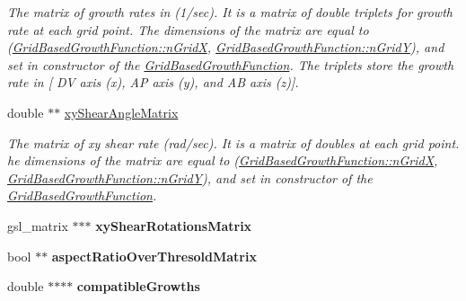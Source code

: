 \begin{DoxyCompactItemize}
\begin{DoxyCompactList}\small\item\em The matrix of growth rates in (1/sec). It is a matrix of double triplets for growth rate at each grid point. The dimensions of the matrix are equal to (\hyperlink{classGridBasedGrowthFunction_af872b9963f3a579dcd615c23bcb58a86}{Grid\+Based\+Growth\+Function\+::n\+Grid\+X}, \hyperlink{classGridBasedGrowthFunction_a625bc963a1f1e7d1f1a35dbd0ef51728}{Grid\+Based\+Growth\+Function\+::n\+Grid\+Y}), and set in constructor of the \hyperlink{classGridBasedGrowthFunction}{Grid\+Based\+Growth\+Function}. The triplets store the growth rate in \mbox{[} D\+V axis (x), A\+P axis (y), and A\+B axis (z)\mbox{]}. \end{DoxyCompactList}\item 
\hypertarget{classGridBasedGrowthFunction_aa01cee8282299e18f27b47645da17438}{}double $\ast$$\ast$ \hyperlink{classGridBasedGrowthFunction_aa01cee8282299e18f27b47645da17438}{xy\+Shear\+Angle\+Matrix}\label{classGridBasedGrowthFunction_aa01cee8282299e18f27b47645da17438}

\begin{DoxyCompactList}\small\item\em The matrix of xy shear rate (rad/sec). It is a matrix of doubles at each grid point. he dimensions of the matrix are equal to (\hyperlink{classGridBasedGrowthFunction_af872b9963f3a579dcd615c23bcb58a86}{Grid\+Based\+Growth\+Function\+::n\+Grid\+X}, \hyperlink{classGridBasedGrowthFunction_a625bc963a1f1e7d1f1a35dbd0ef51728}{Grid\+Based\+Growth\+Function\+::n\+Grid\+Y}), and set in constructor of the \hyperlink{classGridBasedGrowthFunction}{Grid\+Based\+Growth\+Function}. \end{DoxyCompactList}\item 
\hypertarget{classGridBasedGrowthFunction_a62e3267b367261ff2f37cee9a7c2b02b}{}gsl\+\_\+matrix $\ast$$\ast$$\ast$ {\bfseries xy\+Shear\+Rotations\+Matrix}\label{classGridBasedGrowthFunction_a62e3267b367261ff2f37cee9a7c2b02b}

\item 
\hypertarget{classGridBasedGrowthFunction_a56ff4380487e4d24881431f0e6ea6f2e}{}bool $\ast$$\ast$ {\bfseries aspect\+Ratio\+Over\+Thresold\+Matrix}\label{classGridBasedGrowthFunction_a56ff4380487e4d24881431f0e6ea6f2e}

\item 
\hypertarget{classGridBasedGrowthFunction_a59b0e127387157f89f099ae3beeaa671}{}double $\ast$$\ast$$\ast$$\ast$ {\bfseries compatible\+Growths}\label{classGridBasedGrowthFunction_a59b0e127387157f89f099ae3beeaa671}


\end{DoxyCompactItemize}
